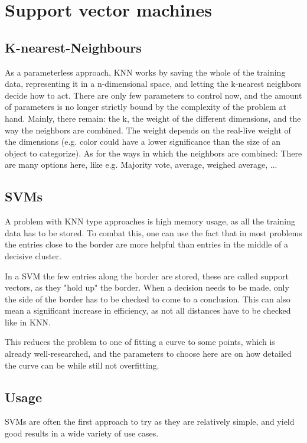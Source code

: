\section{Support vector machines}
\label{sec:SVM}
\subsection{K-nearest-Neighbours}
As a parameterless approach, KNN works by saving the whole of the training data, representing it in a n-dimensional space, and letting the k-nearest neighbors decide how to act. There are only few parameters to control now, and the amount of parameters is no longer strictly bound by the complexity of the problem at hand. Mainly, there remain: the k, the weight of the different dimensions, and the way the neighbors are combined. 
The weight depends on the real-live weight of the dimensions (e.g. color could have a lower significance than the size of an object to categorize).
As for the ways in which the neighbors are combined: There are many options here, like e.g. Majority vote, average, weighed average, ...
\subsection{SVMs}
A problem with KNN type approaches is high memory usage, as all the training data has to be stored. To combat this, one can use the fact that in most problems the entries close to the border are more helpful than entries in the middle of a decisive cluster.

In a SVM the few entries along the border are stored, these are called support vectors, as they "hold up" the border. When a decision needs to be made, only the side of the border has to be checked to come to a conclusion. This can also mean a significant increase in efficiency, as not all distances have to be checked like in KNN.

This reduces the problem to one of fitting a curve to some points, which is already well-researched, and the parameters to choose here are on how detailed the curve can be while still not overfitting.
\subsection{Usage}
SVMs are often the first approach to try as they are relatively simple, and yield good results in a wide variety of use cases.